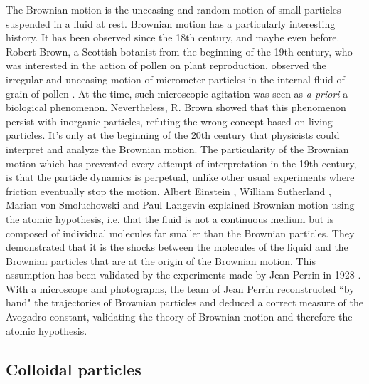 \documentclass[%
 aip,
 jmp,%
 amsmath,amssymb,
reprint,%
]{revtex4-1}
\begin{document}
The Brownian motion is the unceasing and random motion of small particles suspended in a fluid at rest. Brownian motion has a particularly interesting history. It has been observed since the 18th century, and maybe even before. Robert Brown, a Scottish botanist from the beginning of the 19th century, who was interested in the action of pollen on plant reproduction, observed the irregular and unceasing motion of micrometer particles in the internal fluid of grain of pollen \citep{13_brown1828brief}. At the time, such microscopic agitation was seen as \textit{a priori} a biological phenomenon. Nevertheless, R. Brown showed that this phenomenon persist with inorganic particles, refuting the wrong concept based on living particles. It's only at the beginning of the 20th century that physicists could interpret and analyze the Brownian motion. The particularity of the Brownian motion which has prevented every attempt of interpretation in the 19th century, is that the particle dynamics is perpetual, unlike other usual experiments where friction eventually stop the motion. Albert Einstein \citep{9_einstein1906theory}, William Sutherland \citep{14_sutherland1905lxxv}, Marian von Smoluchowski \citep{10_von1906kinetischen} and Paul Langevin \citep{15_Langevin} explained Brownian motion using the atomic hypothesis, i.e. that the fluid is not a continuous medium but is composed of individual molecules far smaller than the Brownian particles. They demonstrated that it is the shocks between the molecules of the liquid and the Brownian particles that are at the origin of the Brownian motion. This assumption has been validated by the experiments made by Jean Perrin in 1928 \citep{22_perrin2014atomes}. With a microscope and photographs, the team of Jean Perrin reconstructed ``by hand" the trajectories of Brownian particles and deduced a correct measure of the Avogadro constant, validating the theory of Brownian motion and therefore the atomic hypothesis.


\subsection{Colloidal particles}
\end{document}
